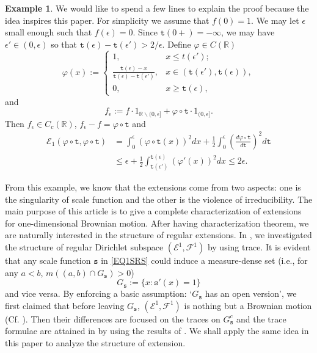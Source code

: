 \documentclass[a4paper]{amsart}
\theoremstyle{definition}
\newtheorem{example}[theorem]{Example}
\theoremstyle{remark}
\numberwithin{equation}{section}
\begin{document}
\begin{example}
We would like to spend a few lines to explain the proof because the idea inspires this paper. For simplicity we assume that $f(0)=1$. We may let $\epsilon$ small enough such that $f(\epsilon)=0$. Since ${{\mathtt{t}}}(0+)=-\infty$, we may have $\epsilon'\in (0,\epsilon)$ so that ${{\mathtt{t}}}(\epsilon)-{{\mathtt{t}}}(\epsilon')>2/\epsilon$. Define $\varphi\in C(\mathbb{R})$
$$\varphi(x):=\begin{cases}1,& x\le t(\epsilon');\\
\frac{{{\mathtt{t}}}(\epsilon)-x}{{{\mathtt{t}}}(\epsilon)- {{\mathtt{t}}}(\epsilon')},& x\in {({{\mathtt{t}}}(\epsilon'),{{\mathtt{t}}}(\epsilon))},\\
0,& x\ge {{\mathtt{t}}}(\epsilon),\end{cases}$$
and $$f_{\epsilon} :=f\cdot 1_{\mathbb{R}\backslash (0,\epsilon]}+\varphi\circ {{\mathtt{t}}}\cdot1_{(0,\epsilon]}.$$
Then $f_{\epsilon}\in C_c(\mathbb{R})$, $f_\epsilon-f=\varphi\circ {{\mathtt{t}}}$ and
\begin{align*} {{\mathcal{E}}}_1(\varphi\circ{{\mathtt{t}}},\varphi\circ{{\mathtt{t}}})&=\int_0^\epsilon (\varphi\circ{{\mathtt{t}}}(x))^2dx+
\frac{1}{2} \int_0^\epsilon \left(\frac{d\varphi\circ{{\mathtt{t}}}}{d{{\mathtt{t}}}}\right)^2d{{\mathtt{t}}}\\
&\le \epsilon+\frac{1}{2}\int_{{{\mathtt{t}}}(\epsilon')}^{{{\mathtt{t}}}(\epsilon)} (\varphi'(x))^2dx\le 2\epsilon.\end{align*}
\end{example}

From this example, we know that the extensions come from two aspects: one is the singularity of scale function and the other is
the violence of irreducibility. The main purpose of this article is to give a complete characterization of extensions for one-dimensional Brownian motion.
After having characterization theorem, we are naturally interested in the structure of regular extensions.
In \cite{LY14}, we investigated the structure of regular Dirichlet subspace $({{\mathcal{E}}}^1,{{\mathcal{F}}}^1)$ by using trace. It is evident that any scale function ${{\mathtt{s}}}$ in \eqref{EQ1SRS} could induce a measure-dense set (i.e., for any $a<b$, $m((a,b)\cap G_{{\mathtt{s}}})>0$)
\[
G_{{\mathtt{s}}}:=\{x: {{\mathtt{s}}}'(x)=1\}
\]
and vice versa. By enforcing a basic assumption: `$G_{{\mathtt{s}}}$ has an open version', we first claimed that before leaving $G_{{\mathtt{s}}}$, $({{\mathcal{E}}}^1,{{\mathcal{F}}}^1)$ is nothing but a Brownian motion (Cf. \cite[Lemma~2.2]{LY14}). Then their differences are focused on the traces on $G_{{\mathtt{s}}}^c$ and the trace formulae are attained in \cite[Theorem~2.1]{LY14} by using the results of  \cite{CFY06}. We shall apply the same idea in this paper to analyze the structure of extension.
\end{document}
